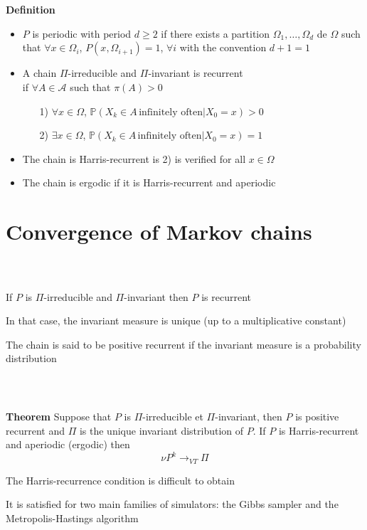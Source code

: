 \documentclass[notes,professionalfont,11pt,usenames,dvipsnames]{beamer}
\renewcommand{\mathcal}{\mathscr}
\newcommand{\vs}{\bigskip}
\renewcommand{\mathcal}{\mathscr}
\renewcommand{\P}{\mathbb{P}}
\newcommand\justify{\rightskip0pt \leftskip0pt}
\newenvironment{slide}
{\begin{frame}[environment=slide]
\frametitle{\insertsection \\ \insertsubsection}\justify\setlength{\parskip}{0.5cm}\vspace{-0.5cm}}
{\end{frame}}
\begin{document}
\begin{slide}

{\bf Definition}
\begin{itemize}
\vspace{-0.25cm} \item $P$ is periodic with period $d\geq 2$ if there exists a partition 
$\Omega_1,\ldots,\Omega_d$ de $\Omega$ such that $\forall x\in\Omega_i$,
$P(x,\Omega_{i+1})=1$, $\forall i$ with the convention $d+1=1$

\vs \item A chain $\Pi$-irreducible and $\Pi$-invariant is recurrent \\
if $\forall A\in\mathcal{A}$ such that $\pi(A)>0$
\begin{enumerate}
\item[1)] $\forall x\in\Omega$, $\P(X_k\in A\,\mbox{infinitely often}|X_0=x)>0$
\item[2)] $\exists x\in \Omega$, $\P(X_k\in A\,\mbox{infinitely often}|X_0=x)=1$
\end{enumerate}

\vs \item The chain is Harris-recurrent is 2) is verified for all $x\in\Omega$

\vs \item The chain is ergodic if it is Harris-recurrent and aperiodic
\end{itemize}

\end{slide}

\section{Convergence of Markov chains}

\begin{slide}

If $P$ is $\Pi$-irreducible and $\Pi$-invariant then $P$ is recurrent


In that case, the invariant measure is unique (up to a multiplicative constant)


The chain is said to be positive recurrent if the invariant measure is a probability distribution


\end{slide}

\begin{slide}

{\bf Theorem} Suppose that $P$ is $\Pi$-irreducible et $\Pi$-invariant, then $P$ is positive recurrent
and $\Pi$ is the unique invariant distribution of $P$.
If $P$ is Harris-recurrent and aperiodic (ergodic) then
$$
\nu P^k\longrightarrow_{VT} \Pi
$$


The Harris-recurrence condition is difficult to obtain


It is satisfied for two main families of simulators:
the Gibbs sampler and the Metropolis-Hastings algorithm

\end{slide}
\end{document}
